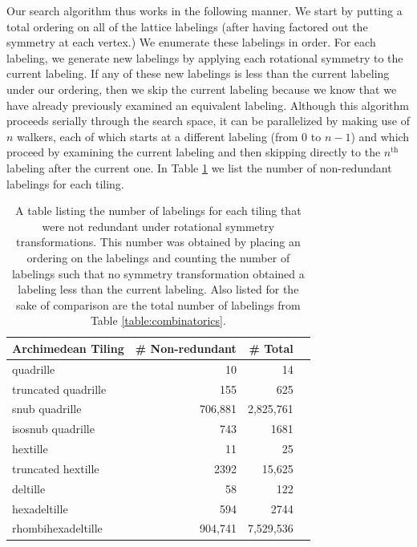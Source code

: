 \documentclass[12pt]{amsbook}
\theoremstyle{plain}
\theoremstyle{definition}
\theoremstyle{remark}
\begin{document}
Our search algorithm thus works in the following manner.  We start by putting a total ordering on all of the lattice labelings (after having factored out the symmetry at each vertex.)  We enumerate these labelings in order.  For each labeling, we generate new labelings by applying each rotational symmetry to the current labeling.  If any of these new labelings is less than the current labeling under our ordering, then we skip the current labeling because we know that we have already previously examined an equivalent labeling.  Although this algorithm proceeds serially through the search space, it can be parallelized by making use of $n$ walkers, each of which starts at a different labeling (from $0$ to $n-1$) and which proceed by examining the current labeling and then skipping directly to the $n^{\text{th}}$ labeling after the current one.  In Table \ref{table:count-of-labels-scanned} we list the number of non-redundant labelings for each tiling.

\begin{table}
\begin{tabular}{lrrr} \toprule
Archimedean Tiling & \# Non-redundant & \# Total \\ \midrule
quadrille & 10 & 14\\
truncated quadrille & 155 & 625\\
snub quadrille & 706,881 & 2,825,761\\
isosnub quadrille & 743 & 1681\\
hextille & 11 & 25\\
truncated hextille & 2392 & 15,625\\
deltille & 58 & 122\\
hexadeltille & 594 & 2744\\
rhombihexadeltille & 904,741 & 7,529,536\\ \bottomrule
\end{tabular}
\caption[Number of non-redundant labelings in each tiling]{
\label{table:count-of-labels-scanned}
A table listing the number of labelings for each tiling that were not redundant under rotational symmetry transformations.  This number was obtained by placing an ordering on the labelings and counting the number of labelings such that no symmetry transformation obtained a labeling less than the current labeling.  Also listed for the sake of comparison are the total number of labelings from Table \ref{table:combinatorics}.}
\end{table}
\end{document}
